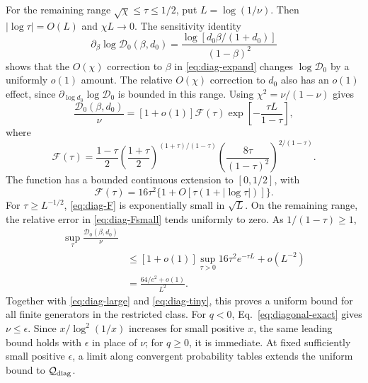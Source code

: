 \documentclass[aps,pra,reprint,amsmath,amssymb,nofootinbib,floatfix,longbibliography]{revtex4-2}
\theoremstyle{aps}
\newcommand{\eps}{\epsilon}
\begin{document}
For the remaining range $\sqrt\chi\le\tau\le1/2$, put $L=\log(1/\nu)$. Then $|\log\tau|=O(L)$ and $\chi L\to0$. The sensitivity identity
\begin{equation}\label{eq:diag-derivative}
 \partial_\beta\log\mathcal D_0(\beta,d_0)
 =\frac{\log[d_0\beta/(1+d_0)]}{(1-\beta)^2}
\end{equation}
shows that the $O(\chi)$ correction to $\beta$ in \eqref{eq:diag-expand} changes $\log\mathcal D_0$ by a uniformly $o(1)$ amount. The relative $O(\chi)$ correction to $d_0$ also has an $o(1)$ effect, since $\partial_{\log d_0}\log\mathcal D_0$ is bounded in this range. Using $\chi^2=\nu/(1-\nu)$ gives
\begin{equation}\label{eq:diag-F}
 \frac{\mathcal D_0(\beta,d_0)}\nu
 =[1+o(1)]\mathcal F(\tau)
 \exp\left[-\frac{\tau L}{1-\tau}\right],
\end{equation}
where
\begin{equation}\label{eq:diag-Fdef}
 \mathcal F(\tau)=\frac{1-\tau}{2}
 \left(\frac{1+\tau}{2}\right)^{(1+\tau)/(1-\tau)}
 \left(\frac{8\tau}{(1-\tau)^2}\right)^{2/(1-\tau)}.
\end{equation}
The function has a bounded continuous extension to $[0,1/2]$, with
\begin{equation}\label{eq:diag-Fsmall}
 \mathcal F(\tau)=16\tau^2
 \{1+O[\tau(1+|\log\tau|)]\}.
\end{equation}
For $\tau\ge L^{-1/2}$, \eqref{eq:diag-F} is exponentially small in $\sqrt L$. On the remaining range, the relative error in \eqref{eq:diag-Fsmall} tends uniformly to zero. As $1/(1-\tau)\ge1$,
\begin{equation}\label{eq:diag-optimized}
 \begin{aligned}
 \sup_\tau\frac{\mathcal D_0(\beta,d_0)}\nu
 \\&\le[1+o(1)]\sup_{\tau>0}16\tau^2e^{-\tau L}+o(L^{-2})
 \\&=\frac{64/e^2+o(1)}{L^2}.
 \end{aligned}
\end{equation}
Together with \eqref{eq:diag-large} and \eqref{eq:diag-tiny}, this proves a uniform bound for all finite generators in the restricted class. For $q<0$, Eq.~\eqref{eq:diagonal-exact} gives $\nu\le\eps$. Since $x/\log^2(1/x)$ increases for small positive $x$, the same leading bound holds with $\eps$ in place of $\nu$; for $q\ge0$, it is immediate. At fixed sufficiently small positive $\eps$, a limit along convergent probability tables extends the uniform bound to $\mathcal Q_{\rm diag}$.
\end{document}
